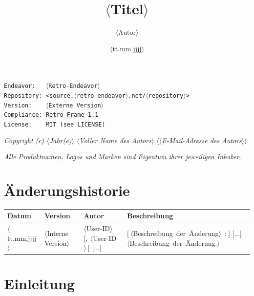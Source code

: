 \documentclass{scrartcl}
\title{$\langle$Titel$\rangle$}
\author{$\langle$Autor$\rangle$}
\date{$\langle$tt.mm.jjjj$\rangle$}
\begin{document}
\begin{titlepage}
\maketitle
\vspace{300pt}

\noindent \texttt{Endeavor:~~~$\langle$Retro-Endeavor$\rangle$}\\
\noindent \texttt{Repository:~<source.$\langle$retro-endeavor$\rangle$.net/$\langle$repository$\rangle$>}\\
\noindent \texttt{Version:~~~~$\langle$Externe Version$\rangle$}\\
\noindent \texttt{Compliance:~Retro-Frame 1.1}\\
\noindent \texttt{License:~~~~MIT (see LICENSE)}

\vspace{10pt}
\noindent \textit{Copyright (c) $\langle$Jahr(e)$\rangle$ $\langle$Voller Name des Autors$\rangle$ $\langle\langle$E-Mail-Adresse des Autors$\rangle\rangle$}

\vspace{10pt}
\noindent \textit{Alle Produktnamen, Logos und Marken sind Eigentum ihrer jeweiligen Inhaber.}

\newpage

\section*{Änderungshistorie}

\vspace{10pt}
\begin{tabularx}{\textwidth}{|p{52pt}|p{42pt}|p{65pt}|X|}
\hline
\textbf{Datum} & \textbf{Version} & \textbf{Autor} & \textbf{Beschreibung}\\
\hline
$\langle$tt.mm.jjjj$\rangle$ & $\langle$Interne Version$\rangle$ & $\langle$User-ID$\rangle$ $[,~\langle$User-ID$\rangle~]$ [...] & $[~\langle$Beschreibung~der~Änderung$\rangle$~;$~]$ [...] $\langle$Beschreibung~der~Änderung.$\rangle$\\
\hline
\end{tabularx}

\end{titlepage}

\newpage

\tableofcontents

\newpage

\section{Einleitung}
\end{document}
